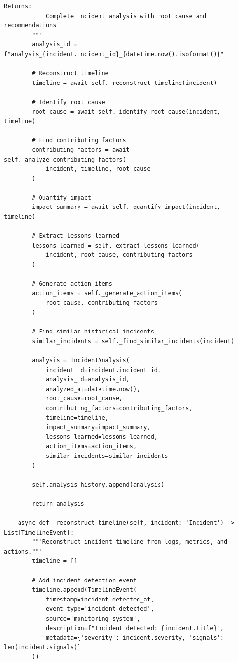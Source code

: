 \begin{lstlisting}[style=python, caption={Post-incident analysis with root cause identification}]
        Returns:
            Complete incident analysis with root cause and recommendations
        """
        analysis_id = f"analysis_{incident.incident_id}_{datetime.now().isoformat()}"

        # Reconstruct timeline
        timeline = await self._reconstruct_timeline(incident)

        # Identify root cause
        root_cause = await self._identify_root_cause(incident, timeline)

        # Find contributing factors
        contributing_factors = await self._analyze_contributing_factors(
            incident, timeline, root_cause
        )

        # Quantify impact
        impact_summary = await self._quantify_impact(incident, timeline)

        # Extract lessons learned
        lessons_learned = self._extract_lessons_learned(
            incident, root_cause, contributing_factors
        )

        # Generate action items
        action_items = self._generate_action_items(
            root_cause, contributing_factors
        )

        # Find similar historical incidents
        similar_incidents = self._find_similar_incidents(incident)

        analysis = IncidentAnalysis(
            incident_id=incident.incident_id,
            analysis_id=analysis_id,
            analyzed_at=datetime.now(),
            root_cause=root_cause,
            contributing_factors=contributing_factors,
            timeline=timeline,
            impact_summary=impact_summary,
            lessons_learned=lessons_learned,
            action_items=action_items,
            similar_incidents=similar_incidents
        )

        self.analysis_history.append(analysis)

        return analysis

    async def _reconstruct_timeline(self, incident: 'Incident') -> List[TimelineEvent]:
        """Reconstruct incident timeline from logs, metrics, and actions."""
        timeline = []

        # Add incident detection event
        timeline.append(TimelineEvent(
            timestamp=incident.detected_at,
            event_type='incident_detected',
            source='monitoring_system',
            description=f"Incident detected: {incident.title}",
            metadata={'severity': incident.severity, 'signals': len(incident.signals)}
        ))


\end{lstlisting}
